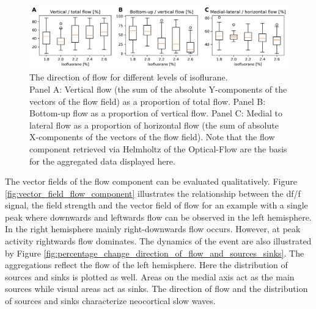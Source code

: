 \begin{figure}[!htb]
\centering
\includegraphics[width=\textwidth,height=\textheight,keepaspectratio]{Figures/direction_per_isoflourane}
\decoRule
\caption[Direction of flow for different levels of isoflurane]{The direction of flow for different levels of isoflurane.\\Panel A: Vertical flow (the sum of the absolute Y-components of the vectors of the flow field) as a proportion of total flow. Panel B: Bottom-up flow as a proportion of vertical flow. Panel C: Medial to lateral flow as a proportion of horizontal flow (the sum of absolute X-components of the vectors of the flow field). Note that the flow component retrieved via Helmholtz  of the Optical-Flow are the basis for the aggregated data displayed here.}
\label{fig:direction_per_isoflourane}
\end{figure}
The vector fields of the flow component can be evaluated qualitatively. Figure \ref{fig:vector_field_flow_component} illustrates the relationship between the df/f signal, the field strength and the vector field of flow for an example with a single peak where downwards and leftwards flow can be observed in the left hemisphere. In the right hemisphere mainly right-downwards flow occurs. However, at peak activity rightwards flow dominates. The dynamics of the event are also illustrated by Figure \ref{fig:percentage_change_direction_of_flow_and_sources_sinks}. The aggregations reflect the flow of the left hemisphere. Here the distribution of sources and sinks is plotted as well. Areas on the medial axis act as the main sources while visual areas act as sinks. The direction of flow and the distribution of sources and sinks characterize neocortical slow waves.\\
